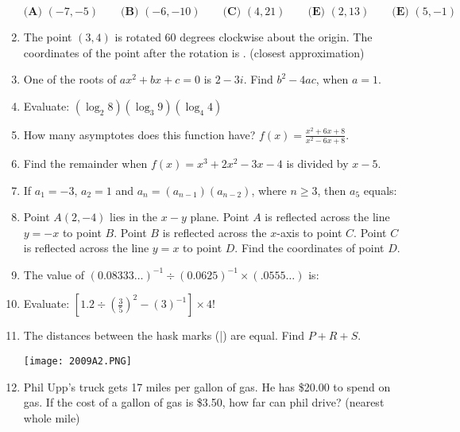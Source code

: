 \documentclass[../uilmath.tex]{subfiles}
\begin{document}
\begin{enumerate}[label=\bfseries\arabic*.]
        $\textbf{(A) } (-7,-5) \qquad \textbf{(B) } (-6,-10) \qquad \textbf{(C) } (4,21) \qquad \textbf{(E) } (2,13) \qquad \textbf{(E) } (5,-1)$

        \item %
        The point $(3,4)$ is rotated 60 degrees clockwise about the origin. The coordinates of the point after the rotation is \blank. (closest approximation)

        \item %
        One of the roots of $ax^2+bx+c=0$ is $2-3i$. Find $b^2-4ac$, when $a=1$.

        \item %
        Evaluate: $(\log_2 8)(\log_3 9)(\log_4 4)$
    
        \item %
        How many asymptotes does this function have? $f(x)=\frac{x^2+6x+8}{x^2-6x+8}$.

        \item %
        Find the remainder when $f(x)=x^3+2x^2-3x-4$ is divided by $x-5$.

        \item %
        If $a_1=-3$, $a_2=1$ and $a_n=(a_{n-1})(a_{n-2})$, where $n\geq 3$, then $a_5$ equals:

        \item %
        Point $A(2,-4)$ lies in the $x-y$ plane. Point $A$ is reflected across the line $y=-x$ to point $B$. Point $B$ is reflected across the $x$-axis to point $C$.
        Point $C$ is reflected across the line $y=x$ to point $D$. Find the coordinates of point $D$.

        \item %
        The value of $(0.08333\dots)^{-1}\div (0.0625)^{-1}\times(.0555\dots)$ is:

        \item %
        Evaluate: $[1.2\div (\frac{3}{5})^2-(3)^{-1}]\times4!$

        \item %
        The distances between the hask marks (|) are equal. Find $P+R+S$.
        \begin{center}
            \texttt{[image: 2009A2.PNG]}
        \end{center}

        \item %
        Phil Upp's truck gets 17 miles per gallon of gas. He has \$20.00 to spend on gas. If the cost of a gallon of gas is \$3.50, how far can phil drive? (nearest whole mile)


\end{enumerate}
\end{document}

